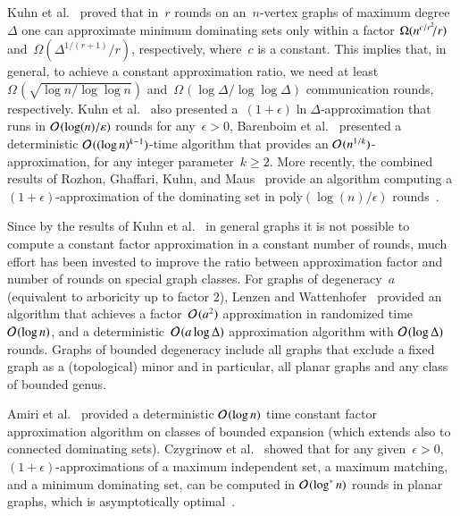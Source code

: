 \medskip
Kuhn et al.~\cite{KuhnMW16} proved that in~$r$ rounds on an~$n$-vertex graphs of maximum degree
$\Delta$ one can approximate minimum dominating sets only within a factor $\Omega(n^{c/r^{\mathrlap{2}}}/r)$
and~$\Omega(\Delta^{1/(r+1)}/r)$, respectively, where~$c$ is a constant.
This implies that, in general, to achieve a constant approximation ratio,
we need at least $\Omega\hspace{1pt}(\sqrt{\log
    n/\log \log n})$ and~$\Omega\hspace{1pt}(\log \Delta/\log \log \Delta)$ communication rounds, respectively.
Kuhn et al.~\cite{KuhnMW16} also presented a~$(1+\epsilon)\ln \Delta$-approximation that runs in $\mathcal{O}\hspace{1pt}(\log(n)/\varepsilon)$ rounds for any~$\epsilon>0$,
Barenboim et al.~\cite{barenboim2018fast}
presented a deterministic $\mathcal{O}\hspace{1pt}((\log n)^{k-1})$-time algorithm that provides an
$\mathcal{O}\hspace{1pt}(n^{1/k})$-approximation, for any integer parameter~$k \ge 2$.
More recently, the combined results of Rozhon, Ghaffari, Kuhn, and Maus~\cite{DBLP:conf/stoc/GhaffariKM17,DBLP:conf/stoc/RozhonG20}
provide an algorithm computing a $(1+\epsilon)$-approximation of the dominating set
in poly$(\log(n)/\epsilon)$ rounds~\cite[Corollary 3.11]{DBLP:conf/stoc/RozhonG20}.

Since by the results of Kuhn et al.~\cite{KuhnMW16} in general graphs it is not
possible to compute a constant factor approximation in a constant number
of rounds,
much effort has been invested to improve the ratio between approximation
factor and number of rounds on special graph classes.
For graphs of degeneracy~$a$ (equivalent to arboricity up to factor $2$),
Lenzen and Wattenhofer~\cite{lenzen2010minimum}
provided an algorithm that achieves a factor~$\mathcal{O}\hspace{1pt}(a^2)$ approximation
in randomized time~$\mathcal{O}\hspace{1pt}(\log n)$, and a deterministic~$\mathcal{O}\hspace{1pt}(a \log
\Delta)$ approximation algorithm
with $\mathcal{O}\hspace{1pt}(\log \Delta)$ rounds. Graphs of bounded degeneracy include all graphs that exclude a fixed graph as a (topological) minor and in particular, all planar graphs and any class of bounded genus.

Amiri et al.~\cite{akhoondian2018distributed} provided a deterministic
$\mathcal{O}\hspace{1pt}(\log n)$ time constant factor approximation algorithm on
classes of bounded expansion (which extends also to connected
dominating sets).
Czygrinow et al.~\cite{czygrinow2008fast} showed
that for any given~\mbox{$\epsilon>0$}, $(1+\epsilon)$-approximations of a maximum independent
set, a maximum matching, and a minimum dominating set, can be computed in
$\mathcal{O}\hspace{1pt}(\log^* n)$ rounds in planar graphs, which is asymptotically optimal~\cite{lenzen2008leveraging}.

